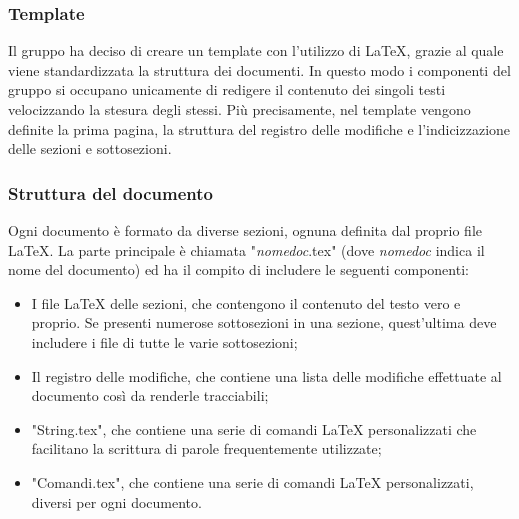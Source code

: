\subsubsection{Template}
Il gruppo ha deciso di creare un template con l'utilizzo di \LaTeX{}, grazie al quale viene standardizzata la struttura dei documenti. In questo modo i componenti del gruppo si occupano unicamente di redigere il contenuto dei singoli testi velocizzando la stesura degli stessi. Più precisamente, nel template vengono definite la prima pagina, la struttura del registro delle modifiche e l'indicizzazione delle sezioni e sottosezioni.

\subsubsection{Struttura del documento}
Ogni documento è formato da diverse sezioni, ognuna definita dal proprio file \LaTeX. La parte principale è chiamata "\textit{nomedoc}.tex" (dove \textit{nomedoc} indica il nome del documento) ed ha il compito di includere le seguenti componenti:
\begin{itemize}
	\item I file \LaTeX{} delle sezioni, che contengono il contenuto del testo vero e proprio. Se presenti numerose sottosezioni in una sezione, quest'ultima deve includere i file di tutte le varie sottosezioni;
	
	\item Il registro delle modifiche, che contiene una lista delle modifiche effettuate al documento così da renderle tracciabili;
	
	\item "String.tex", che contiene una serie di comandi \LaTeX{} personalizzati che facilitano la scrittura di parole frequentemente utilizzate;
	
	\item "Comandi.tex", che contiene una serie di comandi \LaTeX{} personalizzati, diversi per ogni documento.
\end{itemize}

